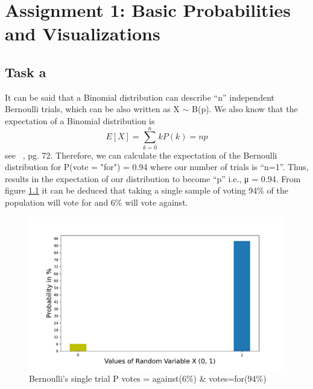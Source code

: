 \chapter{Assignment 1: Basic Probabilities and Visualizations}

\section{Task a}

It can be said that a Binomial distribution can describe “n” independent Bernoulli trials, which can be also written as X ${\sim}$  B(p). We also know that the expectation of a Binomial distribution is \begin{equation}  E [X] = \sum_{k=0}^{n}kP(k)= np \label{task1_a} \end{equation} see ~\cite{Iubh:2021}, pg. 72. \newline
Therefore, we can calculate the expectation of the Bernoulli distribution for P(vote = "for") = 0.94 where our number of trials is “n=1”. Thus, results in the expectation of our distribution to become “p” i.e., μ = 0.94. From figure \ref{fig:task_1_a} it can be deduced that taking a single sample of voting 94\% of the population will vote for and 6\% will vote against.

\begin{figure}[h!]
\centering
\includegraphics[width=\textwidth]{pics/task_1_a.pdf}
\caption{Bernoulli’s single trial P votes = against(6\%) \& votes=for(94\%)}\label{fig:task_1_a}
\end{figure}
\FloatBarrier 

